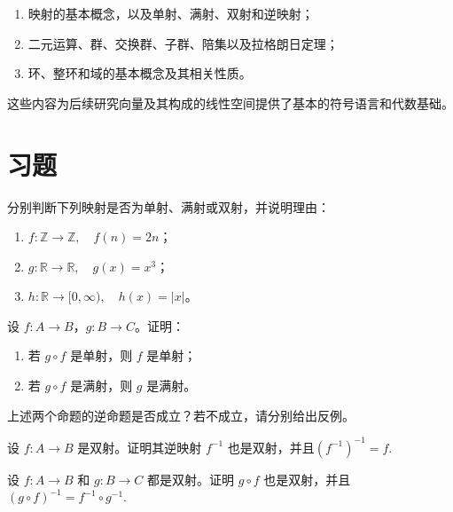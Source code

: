 \begin{enumerate}
    \item 映射的基本概念，以及单射、满射、双射和逆映射；
    \item 二元运算、群、交换群、子群、陪集以及拉格朗日定理；
    \item 环、整环和域的基本概念及其相关性质。
\end{enumerate}

这些内容为后续研究向量及其构成的线性空间提供了基本的符号语言和代数基础。

\section{习题}
\label{sec_abstract_exercises}

\begin{exercise}
    \label{exer_abstract_1}
    分别判断下列映射是否为单射、满射或双射，并说明理由：
    \begin{enumerate}
        \item \(f:\mathbb Z\rightarrow\mathbb Z,\quad f(n)=2n\)；
        \item \(g:\mathbb R\rightarrow\mathbb R,\quad g(x)=x^3\)；
        \item \(h:\mathbb R\rightarrow[0,\infty),\quad h(x)=|x|\)。
    \end{enumerate}
\end{exercise}

\begin{exercise}
    \label{exer_abstract_2}
    设 \(f:A\rightarrow B\)，\(g:B\rightarrow C\)。证明：
    \begin{enumerate}
        \item 若 \(g\circ f\) 是单射，则 \(f\) 是单射；
        \item 若 \(g\circ f\) 是满射，则 \(g\) 是满射。
    \end{enumerate}
    上述两个命题的逆命题是否成立？若不成立，请分别给出反例。
\end{exercise}

\begin{exercise}
    \label{exer_abstract_3}
    设 \(f:A\rightarrow B\) 是双射。证明其逆映射 \(f^{-1}\) 也是双射，并且\( \left(f^{-1}\right)^{-1}=f. \)
\end{exercise}

\begin{exercise}
    \label{exer_abstract_4}
    设 \(f:A\rightarrow B\) 和 \(g:B\rightarrow C\) 都是双射。证明 \(g\circ f\) 也是双射，并且\( (g\circ f)^{-1}=f^{-1}\circ g^{-1}. \)
\end{exercise}

